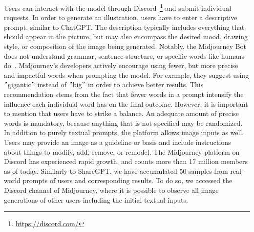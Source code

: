 Users can interact with the model through Discord~\footnote{\url{https://discord.com/}} and submit
individual requests.
In order to generate an illustration, users have to enter a descriptive prompt, similar to
ChatGPT\@.
The description typically includes everything that should appear in the picture, but may also
encompass the desired mood, drawing style, or composition of the image being generated.
Notably, the Midjourney Bot does not understand grammar, sentence structure, or specific words like
humans do~\cite{midjourney_documentation_2023}.
Midjourney's developers actively encourage using fewer, but more precise and impactful words when
prompting the model.
For example, they suggest using \("\)gigantic\("\) instead of \("\)big\("\) in order to achieve
better results.
This recommendation stems from the fact that fewer words in a prompt intensify the influence each
individual word has on the final outcome.
However, it is important to mention that users have to strike a balance.
An adequate amount of precise words is mandatory, because anything that is not specified may be
randomized.
In addition to purely textual prompts, the platform allows image inputs as well.
Users may provide an image as a guideline or basis and include instructions about things to modify,
add, remove, or remodel.
The Midjourney platform on Discord has experienced rapid growth, and counts more than 17 million
members as of today.
Similarly to ShareGPT, we have accumulated 50 samples from real-world prompts of users and
corresponding results.
To do so, we accessed the Discord channel of Midjourney, where it is possible to observe all image
generations of other users including the initial textual inputs.
\newline


